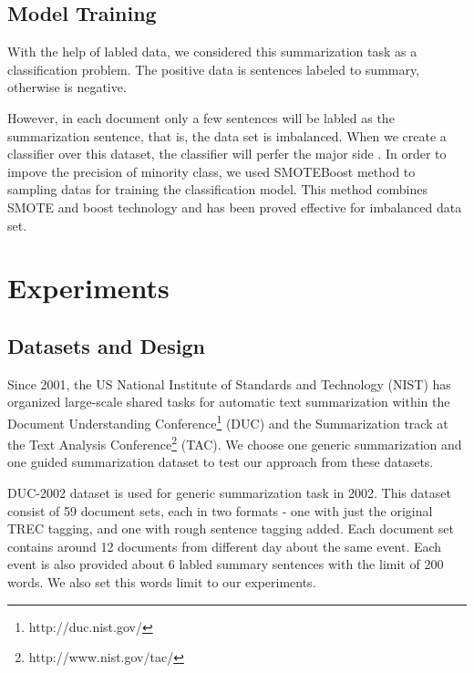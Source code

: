 \documentclass{acm_proc_article-sp}
\begin{document}
\subsection{Model Training}

With the help of labled data, we considered this summarization task as a classification problem. The positive data is sentences labeled to summary, otherwise is negative. 

However, in each document only a few sentences will be labled as the summarization sentence, that is, the data set is imbalanced. 
When we create a classifier over this dataset, the classifier will perfer the major side \cite{chawla2003smoteboost}.
In order to impove the precision of minority class, we used SMOTEBoost\cite{chawla2003smoteboost} method to sampling datas for training the classification model. 
This method combines SMOTE \cite{chawla2011smote} and boost technology and has been proved effective for imbalanced data set. 


%
\section{Experiments}
%

\subsection{Datasets and Design}

Since 2001, the US National Institute of Standards and Technology (NIST) has organized large-scale shared tasks for automatic text summarization within the Document Understanding Conference\footnote{http://duc.nist.gov/} (DUC) and the Summarization track at the Text Analysis Conference\footnote{http://www.nist.gov/tac/} (TAC).
We choose one generic summarization and one guided summarization dataset to test our approach from these datasets.

DUC-2002 dataset is used for generic summarization task in 2002.
This dataset consist of 59 document sets, each in two formats - one with just the original TREC tagging, and one with rough sentence tagging added.
Each document set contains around 12 documents from different day about the same event.
Each event is also provided about 6 labled summary sentences with the limit of 200 words.
We also set this words limit to our experiments.
\end{document}
